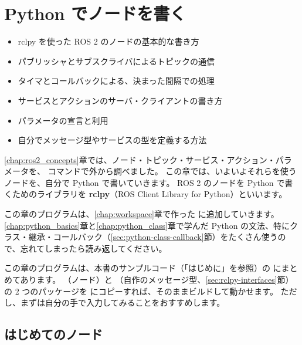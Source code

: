 \chapter{Python でノードを書く}
\label{chap:rclpy}

\begin{goalbox}
  \begin{itemize}
    \item rclpy を使った ROS 2 のノードの基本的な書き方
    \item パブリッシャとサブスクライバによるトピックの通信
    \item タイマとコールバックによる、決まった間隔での処理
    \item サービスとアクションのサーバ・クライアントの書き方
    \item パラメータの宣言と利用
    \item 自分でメッセージ型やサービスの型を定義する方法
  \end{itemize}
\end{goalbox}

\ref{chap:ros2_concepts}章では、ノード・トピック・サービス・アクション・パラメータを、 コマンドで外から調べました。
この章では、いよいよそれらを使うノードを、自分で Python で書いていきます。
ROS 2 のノードを Python で書くためのライブラリを \textbf{rclpy}（ROS Client Library for Python）といいます。

この章のプログラムは、\ref{chap:workspace}章で作った  に追加していきます。
\ref{chap:python_basics}章と\ref{chap:python_class}章で学んだ Python の文法、特にクラス・継承・コールバック（\ref{sec:python-class-callback}節）をたくさん使うので、忘れてしまったら読み返してください。

\begin{point}[この章のサンプルコード]
  この章のプログラムは、本書のサンプルコード（「はじめに」を参照）の  にまとめてあります。
  （ノード）と （自作のメッセージ型、\ref{sec:rclpy-interfaces}節）の 2 つのパッケージを  にコピーすれば、そのままビルドして動かせます。
  ただし、まずは自分の手で入力してみることをおすすめします。
\end{point}

\section{はじめてのノード}
\label{sec:rclpy-first}

